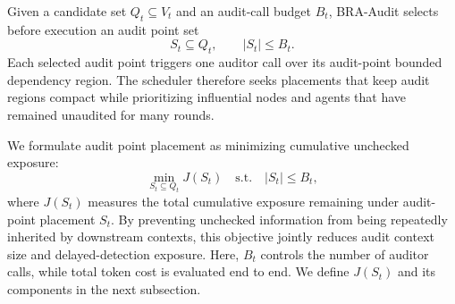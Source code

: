 \documentclass[letterpaper]{article} %
\begin{document}
Given a candidate set \(Q_t\subseteq V_t\) and an audit-call
budget \(B_t\), BRA-Audit selects before execution an audit point
set
\begin{equation}
S_t\subseteq Q_t,
\qquad
|S_t|\leq B_t.
\end{equation}
Each selected audit point triggers one auditor call over its
audit-point bounded dependency region. The scheduler therefore
seeks placements that keep audit regions compact while
prioritizing influential nodes and agents that have remained
unaudited for many rounds.

We formulate audit point placement as minimizing cumulative
unchecked exposure:
\begin{equation}
\min_{S_t\subseteq Q_t} J(S_t)
\quad
\mathrm{s.t.}
\quad
|S_t|\leq B_t,
\end{equation}
where \(J(S_t)\) measures the total cumulative exposure
remaining under audit-point placement \(S_t\). By preventing
unchecked information from being repeatedly inherited by
downstream contexts, this objective jointly reduces audit
context size and delayed-detection exposure. Here, \(B_t\)
controls the number of auditor calls, while total token
cost is evaluated end to end. We define \(J(S_t)\) and
its components in the next subsection.

\end{document}
